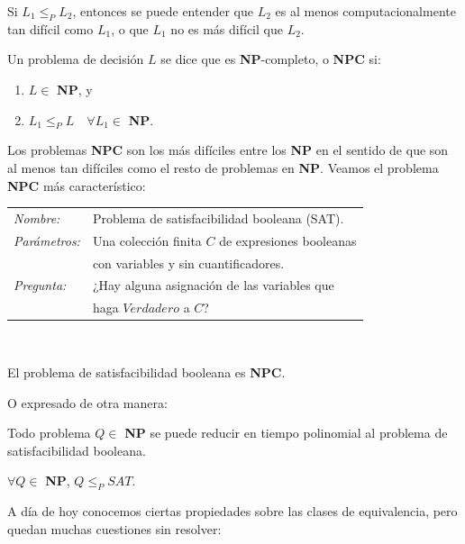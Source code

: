 Si $L_1 \leq_P L_2$, entonces se puede entender que $L_2$ es al menos computacionalmente tan difícil como $L_1$, o que $L_1$ no es más difícil que $L_2$.

\begin{definition}
	Un problema de decisión $L$ se dice que es \textbf{NP}-completo, o \textbf{NPC} si:
	\begin{enumerate}[label=(\roman*)]
		\item $L \in $ \textbf{NP}, y
		\item $L_1 \leq_P L \quad \forall L_1 \in $ \textbf{NP}.
	\end{enumerate}
\end{definition}

\hfil

Los problemas \textbf{NPC} son los más difíciles entre los \textbf{NP} en el sentido de que son al menos tan difíciles como el resto de problemas en \textbf{NP}. Veamos el problema \textbf{NPC} más característico:

\begin{tabular}{|ll}
	\textit{Nombre:} & Problema de satisfacibilidad booleana (SAT). \\
	\textit{Parámetros:} & Una colección finita $C$ de expresiones booleanas \\
	&  con variables y sin cuantificadores. \\
	\textit{Pregunta:} & ¿Hay alguna asignación de las variables que \\ & haga $Verdadero$ a $C$? \\
\end{tabular}
\\

\begin{theorem}
	El problema de satisfacibilidad booleana es \textbf{NPC}.
\end{theorem}


O expresado de otra manera:

\begin{theorem}
	\label{redNPC:theo}
	Todo problema $Q \in $ \textbf{NP} se puede reducir en tiempo polinomial al problema de satisfacibilidad booleana.
	
	$\forall Q \in $ \textbf{NP}, $Q \leq_P SAT$.
\end{theorem}


\hfil

A día de hoy conocemos ciertas propiedades sobre las clases de equivalencia, pero quedan muchas cuestiones sin resolver:

